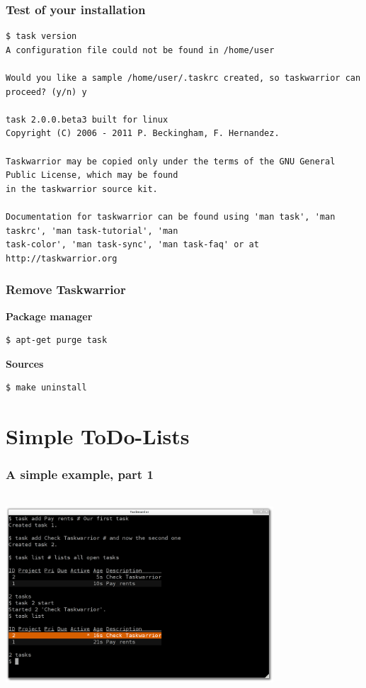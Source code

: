 \documentclass[t,handout]{beamer}
\begin{document}
\begin{frame}[fragile]
\frametitle{Test of your installation}
\begin{lstlisting}
$ task version
A configuration file could not be found in /home/user

Would you like a sample /home/user/.taskrc created, so taskwarrior can proceed? (y/n) y

task 2.0.0.beta3 built for linux
Copyright (C) 2006 - 2011 P. Beckingham, F. Hernandez.

Taskwarrior may be copied only under the terms of the GNU General Public License, which may be found
in the taskwarrior source kit.

Documentation for taskwarrior can be found using 'man task', 'man taskrc', 'man task-tutorial', 'man
task-color', 'man task-sync', 'man task-faq' or at http://taskwarrior.org
\end{lstlisting}
\end{frame}

\begin{frame}[fragile]
\frametitle{Remove Taskwarrior}
\textbf{Package manager}
\begin{lstlisting}
$ apt-get purge task
\end{lstlisting}

\textbf{Sources}
\begin{lstlisting}
$ make uninstall
\end{lstlisting}
\end{frame}

\section{Simple ToDo-Lists}

\begin{frame}
\frametitle{A simple example, part 1}
\begin{center}
\includegraphics[width=10cm,height=7.5cm]{simple_example01.png}
\end{center}
\end{frame}
\end{document}
